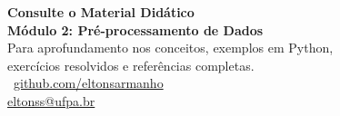 \documentclass[aspectratio=169]{beamer}
\begin{document}
\begin{frame}[c]
    \begin{center}
        \Large \textbf{Consulte o Material Didático}\\[1em]
        \normalsize \textcolor{mineblue}{\textbf{Módulo 2: Pré-processamento de Dados}}\\[0.5em]
        \small Para aprofundamento nos conceitos, exemplos em Python,\\
        exercícios resolvidos e referências completas.\\[1.5em]
        \large \faGithub \ \href{https://github.com/eltonsarmanho}{github.com/eltonsarmanho}\\[0.5em]
        \href{mailto:eltonss@ufpa.br}{eltonss@ufpa.br}
    \end{center}
\end{frame}
\end{document}
